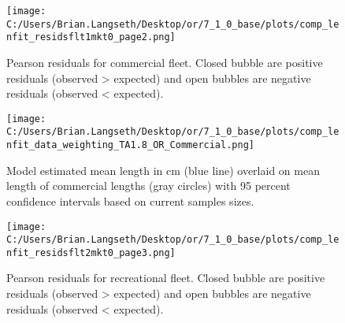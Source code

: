 \documentclass[11pt,
  english,
  a4paper,
]{article}
\begin{document}
\begin{figure}
\centering
\texttt{[image: C:/Users/Brian.Langseth/Desktop/or/7\_1\_0\_base/plots/comp\_lenfit\_residsflt1mkt0\_page2.png]}
\caption{Pearson residuals for commercial fleet. Closed bubble are positive residuals (observed \textgreater{} expected) and open bubbles are negative residuals (observed \textless{} expected).\label{fig:com-pearson}}
\end{figure}

\tagmcend\tagstructend


\begin{figure}
\centering
\texttt{[image: C:/Users/Brian.Langseth/Desktop/or/7\_1\_0\_base/plots/comp\_lenfit\_data\_weighting\_TA1.8\_OR\_Commercial.png]}
\caption{Model estimated mean length in cm (blue line) overlaid on mean length of commercial lengths (gray circles) with 95 percent confidence intervals based on current samples sizes.\label{fig:com-mean-len-fit}}
\end{figure}

\tagmcend\tagstructend


\begin{figure}
\centering
\texttt{[image: C:/Users/Brian.Langseth/Desktop/or/7\_1\_0\_base/plots/comp\_lenfit\_residsflt2mkt0\_page3.png]}
\caption{Pearson residuals for recreational fleet. Closed bubble are positive residuals (observed \textgreater{} expected) and open bubbles are negative residuals (observed \textless{} expected).\label{fig:rec-pearson}}
\end{figure}

\tagmcend\tagstructend

\end{document}
